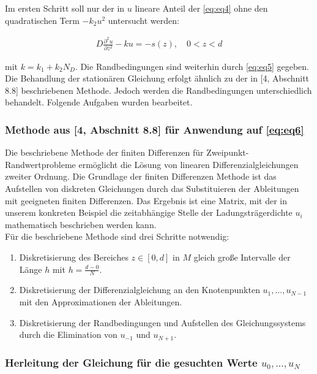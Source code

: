 \documentclass[
	pagesize,
	fontsize=12pt,
	paper=a4,
	oneside,
   reqno
]{scrartcl}
\begin{document}
Im ersten Schritt soll nur der in $u$ lineare Anteil der \autoref{eq:eq4} ohne den quadratischen Term $-k_2u^2$ untersucht werden:

\begin{align}
   \label{eq:eq6}
   D\frac{\partial^2 u}{\partial z^2} - ku = -s(z), \quad 0 < z < d
\end{align}

mit $k = k_1 + k_2N_D$. Die Randbedingungen sind weiterhin durch \autoref{eq:eq5} gegeben. \\

Die Behandlung der stationären Gleichung erfolgt ähnlich zu der in [4, Abschnitt 8.8] beschriebenen Methode. Jedoch werden die Randbedingungen unterschiedlich behandelt. Folgende Aufgaben wurden bearbeitet.

\subsubsection{Methode aus [4, Abschnitt 8.8] für Anwendung auf \autoref{eq:eq6}}

Die beschriebene Methode der finiten Differenzen für Zweipunkt-Randwertprobleme ermöglicht die Lösung von linearen Differenzialgleichungen zweiter Ordnung. Die Grundlage der finiten Differenzen Methode ist das Aufstellen von diskreten Gleichungen durch das Substituieren der Ableitungen mit geeigneten finiten Differenzen. Das Ergebnis ist eine Matrix, mit der in unserem konkreten Beispiel die zeitabhängige Stelle der Ladungsträgerdichte $u_i$ mathematisch beschrieben werden kann. \\

Für die beschriebene Methode sind drei Schritte notwendig:

\begin{enumerate}
   \item Diskretisierung des Bereiches $z \in [0, d]$ in $M$ gleich große Intervalle der Länge $h$ mit $h = \frac{d-0}{N}$.
   \item Diskretisierung der Differenzialgleichung an den Knotenpunkten $u_1, ... , u_{N-1}$ mit den Approximationen der Ableitungen.
   \item Diskretisierung der Randbedingungen und Aufstellen des Gleichungssystems durch die Elimination von $u_{-1}$ und $u_{N+1}$.
\end{enumerate}

\subsubsection{Herleitung der Gleichung für die gesuchten Werte $u_0, ... , u_{N}$}
\end{document}
